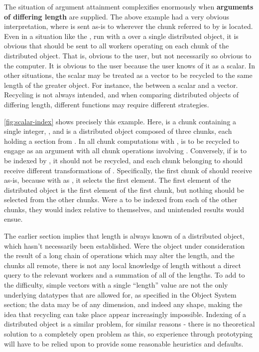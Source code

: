 The situation of argument attainment complexifies enormously when \textbf{arguments of differing length} are supplied.
The above example had a very obvious interpretation, where  is sent as-is to wherever the chunk referred to by  is located.
Even in a situation like the , run with a  over a single distributed object, it is obvious that  should be sent to all workers operating on each chunk of the distributed object.
That is, obvious to the user, but not necessarily so obvious to the computer.
It is obvious to the user because the user knows of it as a scalar.
In other situations, the scalar may be treated as a vector to be recycled to the same length of the greater object.
For instance, the  between a scalar and a vector.
Recycling is not always intended, and when comparing distributed objects of differing length, different functions may require different strategies.

\cref{fig:scalar-index} shows precisely this example.
Here,  is a chunk containing a single integer, , and  is a distributed object composed of three chunks, each holding a section from .
In all chunk computations with ,  is to be recycled to engage as an argument with all chunk operations involving .
Conversely, if  is to be indexed by , it should not be recycled, and each chunk belonging to  should receive different transformations of .
Specifically, the first chunk of  should receive  as-is, because with  as , it selects the first element.
The first element of the distributed object is the first element of the first chunk, but nothing should be selected from the other chunks.
Were a  to be indexed from each of the other chunks, they would index relative to themselves, and unintended results would ensue.


The earlier section implies that length is always known of a distributed object, which hasn't necessarily been established.
Were the object under consideration the result of a long chain of operations which may alter the length, and the chunks all remote, there is not any local knowledge of length without a direct query to the relevant workers and a summation of all of the lengths.
To add to the difficulty, simple vectors with a single ``length'' value are not the only underlying datatypes that are allowed for, as specified in the Object System section; the data may be of any dimension, and indeed any shape, making the idea that recycling can take place appear increasingly impossible.
Indexing of a distributed object is a similar problem, for similar reasons - there is no theoretical solution to a completely open problem as this, so experience through prototyping will have to be relied upon to provide some reasonable heuristics and defaults.

